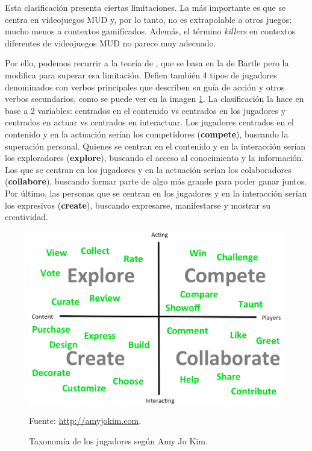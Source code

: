 Esta clasificación presenta ciertas limitaciones. 
%
La más importante es que se centra en videojuegos \gls{MUD} y, por lo tanto, no es extrapolable a otros juegos; mucho menos a contextos gamificados.
%
Además, el término \textit{killers} en contextos diferentes de videojuegos \gls{MUD} no parece muy adecuado.


%
Por ello, podemos recurrir a la teoría de  \cite{AmyJoKim}, que se basa en la de Bartle pero la modifica para superar esa limitación.
%
Defien también 4 tipos de jugadores denominados con verbos principales que describen su guía de acción y otros verbos secundarios, como se puede ver en la imagen \ref{fig::AmyJoKim}.
%
La clasificación la hace en base a 2 variables: centrados en el contenido vs centrados en los jugadores y centrados en actuar vs centrados en interactuar.
%
Los jugadores centrados en el contenido y en la actuación serían los competidores (\textbf{compete}), buscando la superación personal.
%
Quienes se centran en el contenido y en la interacción serían los exploradores (\textbf{explore}), buscando el acceso al conocimiento y la información.
%
Los que se centran en los jugadores y en la actuación serían los colaboradores (\textbf{collabore}), buscando formar parte de algo más grande para poder ganar juntos.
%
Por último, las personas que se centran en los jugadores y en la interacción serían los expresivos (\textbf{create}), buscando expresarse, manifestarse y mostrar su creatividad.

\begin{figure}[hbt]
\begin{center}
\includegraphics[scale=0.25]{img/AmyJoKim.png}
\caption{Taxonomía de los jugadores según Amy Jo Kim.}
\label{fig::AmyJoKim}
\vspace{-0.25cm}
\small{Fuente: \url{http://amyjokim.com}.}
\end{center}
\end{figure}


